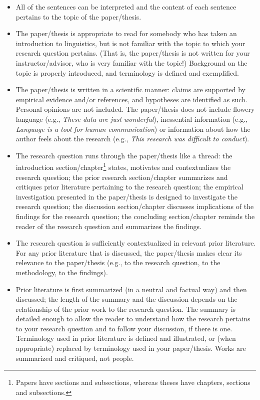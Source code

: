 \documentclass[11pt,fleqn,a4paper/thesis]{article}
\newcommand{\6}{\mbox{$[\hspace*{-.6mm}[$}}
\newcommand{\9}{\mbox{$]\hspace*{-.6mm}]$}}
\begin{document}
\begin{itemize}[itemsep=-1pt,leftmargin=2.5ex,topsep=-2pt]

\item All of the sentences can be interpreted and the content of each sentence pertains to the topic of the paper/thesis.

\item The paper/thesis is appropriate to read for somebody who has taken an introduction to linguistics, but is not familiar with the topic to which your research question pertains. (That is, the paper/thesis is not written for your instructor/advisor, who is very familiar with the topic!) Background on the topic is properly introduced, and terminology is defined and exemplified. 

\item The paper/thesis is written in a scientific manner: claims are supported by empirical evidence and/or references, and hypotheses are identified as such. Personal opinions are not included. The paper/thesis does not include flowery language (e.g., {\em These data are just wonderful}), inessential information (e.g., {\em Language is a tool for human communication}) or information about how the author feels about the research (e.g., {\em This research was difficult to conduct}).

\item The research question runs through the paper/thesis like a thread: the introduction section/chapter\footnote{Papers have sections and subsections, whereas theses have chapters, sections and subsections.} states, motivates and contextualizes the research question; the prior research section/chapter summarizes and critiques prior literature pertaining to the research question; the empirical investigation presented in the paper/thesis is designed to investigate the research question; the discussion section/chapter discusses implications of the findings for the research question; the concluding section/chapter reminds the reader of the research question and summarizes the findings.

\item The research question is sufficiently contextualized in relevant prior literature. For any prior literature that is discussed, the paper/thesis makes clear its relevance to the paper/thesis (e.g., to the research question, to the methodology, to the findings).

\item Prior literature is first summarized (in a neutral and factual way) and then discussed; the length of the summary and the discussion depends on the relationship of the prior work to the research question. The summary is detailed enough to allow the reader to understand how the research pertains to your research question and to follow your discussion, if there is one. Terminology used in prior literature is defined and illustrated, or (when appropriate) replaced by terminology used in your paper/thesis. Works are summarized and critiqued, not people.


\end{itemize}
\end{document}
